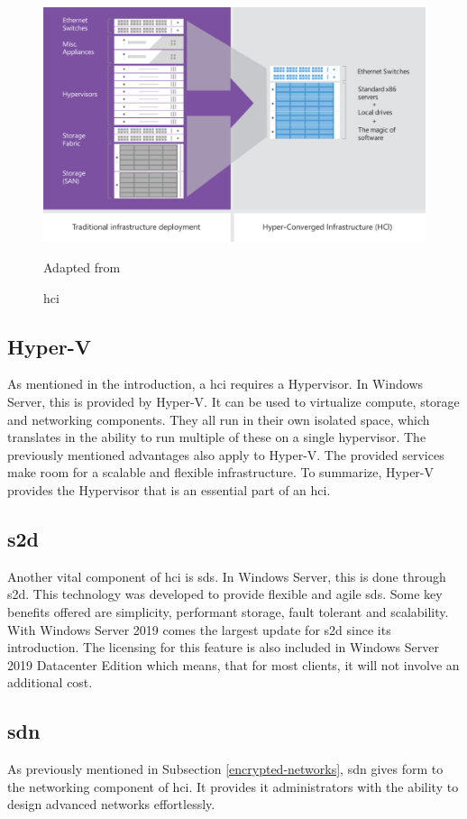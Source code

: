 \begin{figure}[h]
	\includegraphics[width=0.8\linewidth]{img/StandVanZaken/HCI.png}
	\captionsetup{width=0.6\linewidth}
	\centering		
	\caption[\acrshort{hci}]{\acrlong{hci}}
	\scriptsize	
	Adapted from \cite{Woolslayer2018}
	\label{fig:HCI}
\end{figure}

\subsection{Hyper-V}
As mentioned in the introduction, a \acrshort{hci} requires a Hypervisor. 
In Windows Server, this is provided by Hyper-V. It can be used to virtualize compute, storage and networking components.
They all run in their own isolated space, which translates in the ability to run multiple of these on a single hypervisor. 
The previously mentioned advantages also apply to Hyper-V. The provided services make room for a scalable and flexible infrastructure. 
To summarize, Hyper-V provides the Hypervisor that is an essential part of an \acrshort{hci}. \autocite{Short2016}
\subsection{\acrfull{s2d}}
Another vital component of \acrshort{hci} is \acrfull{sds}. 
In Windows Server, this is done through \acrshort{s2d}. 
This technology was developed to provide flexible and agile \acrshort{sds}. 
Some key benefits offered are simplicity, performant storage, fault tolerant and scalability. 
With Windows Server 2019 comes the largest update for \acrshort{s2d} since its introduction. 
The licensing for this feature is also included in Windows Server 2019 Datacenter Edition which means, that for most clients, it will not involve an additional cost. \autocite{Gerend2018a}
\subsection{\acrfull{sdn}}
As previously mentioned in Subsection \ref{encrypted-networks}, \acrshort{sdn} gives form to the networking component of \acrshort{hci}. 
It provides \acrshort{it} administrators with the ability to design advanced networks effortlessly.
